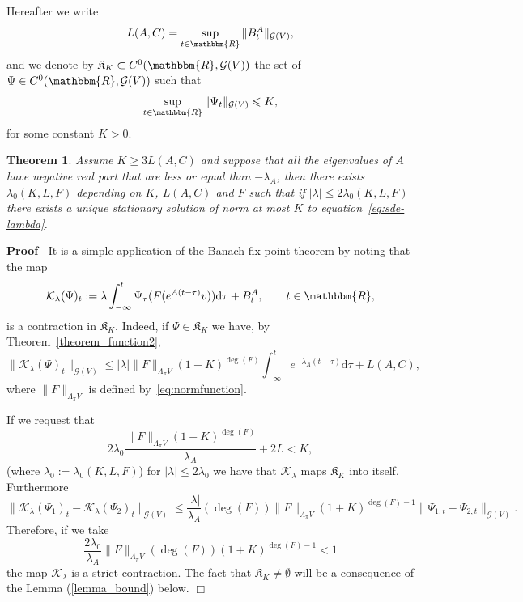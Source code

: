 \documentclass[11pt]{article}
\newcommand{\assign}{:=}
\newcommand{\mathd}{\mathrm{d}}
\newenvironment{proof}{\noindent\textbf{Proof\ }}{\hspace*{\fill}$\Box$\medskip}
\newtheorem{theorem}{Theorem}
\begin{document}
Hereafter we write
\[ L (A, C) = \sup_{t \in \mathbbm{R}} \| B^A_t \|_{\mathcal{G} (V)}, \]
and we denote by $\mathfrak{K}_K \subset C^0 (\mathbbm{R}, \mathcal{G} (V))$
the set of $\Psi \in C^0 (\mathbbm{R}, \mathcal{G} (V))$ such that
\[ \sup_{t \in \mathbbm{R}} \| \Psi_t \|_{\mathcal{G} (V)} \leqslant K_{}, \]
for some constant $K > 0$.

\begin{theorem}
  \label{theorem_stationary}Assume $K \geqslant 3 L (A, C)$ and suppose that
  all the eigenvalues of $A$ have negative real part that are less or equal
  than $- \lambda_A$, then there exists $\lambda_0 (K, L, F)$ depending on
  $K$, $L (A, C)$ and $F$ such that if $| \lambda | \leqslant 2 \lambda_0 (K,
  L, F)$ there exists a unique stationary solution of norm at most $K$ to
  equation~{\eqref{eq:sde-lambda}}.
\end{theorem}

\begin{proof}
  It is a simple application of the Banach fix point theorem by noting that
  the map
  \[ \mathcal{K}_{\lambda} (\Psi)_t \assign \lambda \int_{- \infty}^t
     \Psi_{\tau} (F (e^{A (t - \tau)} v)) \mathd \tau + B^A_t, \qquad t \in
     \mathbbm{R}, \]
  is a contraction in $\mathfrak{K}_K$. Indeed, if $\Psi \in \mathfrak{K}_K$
  we have, by Theorem~\ref{theorem_function2},
  \[ \| \mathcal{K}_{\lambda} (\Psi)_t \|_{\mathcal{G} (V)} \leqslant |
     \lambda |  \| F \|_{\Lambda_{\pi} V} (1 + K)^{\deg (F)} \int_{- \infty}^t
     e^{- \lambda_A (t - \tau)} \mathd \tau + L (A, C), \]
  where $\| F \|_{\Lambda_{\pi} V}$ is defined by~{\eqref{eq:normfunction}}.
  
  If we request that
  \begin{equation}
    2 \lambda_0 \frac{\| F \|_{\Lambda_{\pi} V} (1 + K)^{\deg (F)}}{\lambda_A}
    + 2 L < K, \label{eq:contraction2}
  \end{equation}
  (where $\lambda_0 \assign \lambda_0 (K, L, F)$) for $| \lambda | \leqslant 2
  \lambda_0$ we have that $\mathcal{K}_{\lambda}$ maps $\mathfrak{K}_K$ into
  itself. Furthermore
  \[ \| \mathcal{K}_{\lambda} (\Psi_1)_t - \mathcal{K}_{\lambda} (\Psi_2)_t
     \|_{\mathcal{G} (V)} \leqslant \frac{| \lambda |}{\lambda_A} (\deg (F))
     \| F \|_{\Lambda_{\pi} V} (1 + K)^{\deg (F) - 1} \| \Psi_{1, t} -
     \Psi_{2, t} \|_{\mathcal{G} (V)} . \]
  Therefore, if we take
  \begin{equation}
    \frac{2 \lambda_0}{\lambda_A} \| F \|_{\Lambda_{\pi} V} (\deg (F)) (1 +
    K)^{\deg (F) - 1} < 1 \label{eq:contraction}
  \end{equation}
  the map $\mathcal{K}_{\lambda}$ is a strict contraction. The fact that
  $\mathfrak{K}_K \neq \emptyset$ will be a consequence of the Lemma
  (\ref{lemma_bound}) below.
\end{proof}
\end{document}
